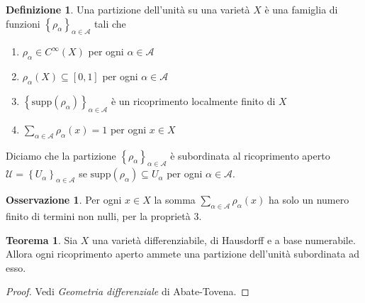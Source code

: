 \documentclass[a4paper,11pt]{article}
\theoremstyle{definition}
\newtheorem{osservazione}{Osservazione}[section]
\newtheorem{definizione}{Definizione}[section]
\theoremstyle{theorem}
\newtheorem{teorema}{Teorema}[section]
\begin{document}
\begin{definizione}
	Una partizione dell'unità su una varietà $X$ è una famiglia di funzioni $\left\{\rho_{\alpha}\right\}_{\alpha\in\mathcal{A}}$ tali che
	\begin{enumerate}
		\item $\rho_{\alpha}\in C^\infty(X)$ per ogni $\alpha\in\mathcal{A}$
		\item $\rho_{\alpha}(X)\subseteq[0,1]$ per ogni $\alpha\in \mathcal{A}$
		\item $\left\{\textrm{supp}(\rho_{\alpha})\right\}_{\alpha\in\mathcal{A}}$ è un ricoprimento localmente finito di $X$
		\item $\sum_{\alpha\in\mathcal{A}}\rho_{\alpha}(x)=1$ per ogni $x\in X$
	\end{enumerate}
	Diciamo che la partizione $\left\{\rho_{\alpha}\right\}_{\alpha\in\mathcal{A}}$ è subordinata al ricoprimento aperto $\mathcal{U}=\left\{U_{\alpha}\right\}_{\alpha\in \mathcal{A}}$ se $\textrm{supp}(\rho_{\alpha})\subseteq U_{\alpha}$ per ogni $\alpha\in \mathcal{A}$.
\end{definizione}
\begin{osservazione}
	Per ogni $x\in X$ la somma $\sum_{\alpha\in\mathcal A}\rho_{\alpha}(x)$ ha solo un numero finito di termini non nulli, per la proprietà 3.
\end{osservazione}
\begin{teorema}
	Sia $X$ una varietà differenziabile, di Hausdorff e a base numerabile. Allora ogni ricoprimento aperto ammete una partizione dell'unità subordinata ad esso.
\end{teorema}
\begin{proof}
	Vedi \textit{Geometria differenziale} di Abate-Tovena.
\end{proof}
\newpage
\end{document}
